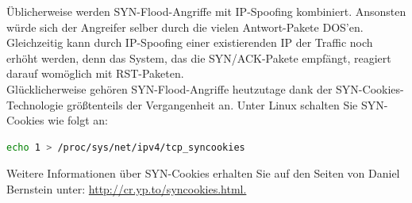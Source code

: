 \documentclass[paper=a4,fontsize=11pt]{scrartcl}%
\numberwithin{equation}{section}
\begin{document}
Üblicherweise werden SYN-Flood-Angriffe mit IP-Spoofing kombiniert. Ansonsten würde sich der Angreifer selber durch die vielen Antwort-Pakete DOS’en. Gleichzeitig kann durch IP-Spoofing einer existierenden IP der Traffic noch erhöht werden, denn das System, das die SYN/ACK-Pakete empfängt, reagiert darauf womöglich mit RST-Paketen.\\
Glücklicherweise gehören SYN-Flood-Angriffe heutzutage dank der SYN-Cookies-Technologie größtenteils der Vergangenheit an.
Unter Linux schalten Sie SYN-Cookies wie folgt an:
\begin{lstlisting}[style=Bash, language=Bash]
echo 1 > /proc/sys/net/ipv4/tcp_syncookies
\end{lstlisting}
Weitere Informationen über SYN-Cookies erhalten Sie auf den Seiten von Daniel Bernstein unter: 
\url{http://cr.yp.to/syncookies.html.}
\end{document}
